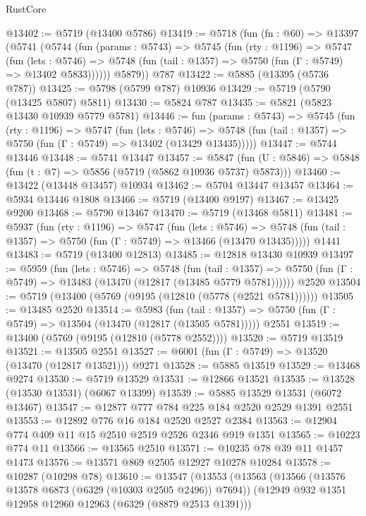 \begin{lexlean}{RustCore}
\begin{coremodule}
@13402 := @5719 (@13400 @5786)
@13419 := @5718
    (fun (fn : @60) =>
    @13397
      (@5741
        (@5744
          (fun (params : @5743) =>
          @5745
            (fun (rty : @1196) =>
            @5747
              (fun (lets : @5746) =>
              @5748 (fun (tail : @1357) => @5750 (fun (Γ : @5749) => @13402 @5833))))))
        @5879))
    @787
@13422 := @5885 (@13395 (@5736 @787))
@13425 := @5798 (@5799 @787) @10936
@13429 := @5719 (@5790 (@13425 @5807) @5811)
@13430 := @5824 @787
@13435 := @5821 (@5823 @13430 @10939 @5779 @5781)
@13446 := fun (params : @5743) =>
  @5745
    (fun (rty : @1196) =>
    @5747
      (fun (lets : @5746) =>
      @5748 (fun (tail : @1357) => @5750 (fun (Γ : @5749) => @13402 (@13429 @13435)))))
@13447 := @5744 @13446
@13448 := @5741 @13447
@13457 := @5847
    (fun (U : @5846) => @5848 (fun (t : @7) => @5856 (@5719 (@5862 @10936 @5737) @5873)))
@13460 := @13422 (@13448 @13457) @10934
@13462 := @5704 @13447 @13457
@13464 := @5934 @13446 @1808
@13466 := @5719 (@13400 @9197)
@13467 := @13425 @9200
@13468 := @5790 @13467
@13470 := @5719 (@13468 @5811)
@13481 := @5937
    (fun (rty : @1196) =>
    @5747
      (fun (lets : @5746) =>
      @5748 (fun (tail : @1357) => @5750 (fun (Γ : @5749) => @13466 (@13470 @13435)))))
    @1441
@13483 := @5719 (@13400 @12813)
@13485 := @12818 @13430 @10939
@13497 := @5959
    (fun (lets : @5746) =>
    @5748
      (fun (tail : @1357) =>
      @5750 (fun (Γ : @5749) => @13483 (@13470 (@12817 (@13485 @5779 @5781))))))
    @2520
@13504 := @5719 (@13400 (@5769 (@9195 (@12810 (@5778 (@2521 @5781))))))
@13505 := @13485 @2520
@13514 := @5983
    (fun (tail : @1357) => @5750 (fun (Γ : @5749) => @13504 (@13470 (@12817 (@13505 @5781)))))
    @2551
@13519 := @13400 (@5769 (@9195 (@12810 (@5778 @2552))))
@13520 := @5719 @13519
@13521 := @13505 @2551
@13527 := @6001 (fun (Γ : @5749) => @13520 (@13470 (@12817 @13521))) @9271
@13528 := @5885 @13519
@13529 := @13468 @9274
@13530 := @5719 @13529
@13531 := @12866 @13521
@13535 := @13528 (@13530 @13531) (@6067 @13399)
@13539 := @5885 @13529 @13531 (@6072 @13467)
@13547 := @12877 @777 @784 @225 @184 @2520 @2529 @1391 @2551
@13553 := @12892 @776 @16 @184 @2520 @2527 @2384
@13563 := @12904 @774 @409 @11 @15 @2510 @2519 @2526 @2346 @919 @1351
@13565 := @10223 @774 @11
@13566 := @13565 @2510
@13571 := @10235 @78 @39 @11 @1457 @1473
@13576 := @13571 @869 @2505 @12927 @10278 @10284
@13578 := @10287 (@10298 @78)
@13610 := @13547
    (@13553
      (@13563
        (@13566 (@13576 @13578 @6873 (@6329 (@10303 @2505 @2496)) @7694))
        (@12949 @932 @1351 @12958 @12960 @12963 (@6329 (@8879 @2513 @1391)))

\end{coremodule}
\end{lexlean}
